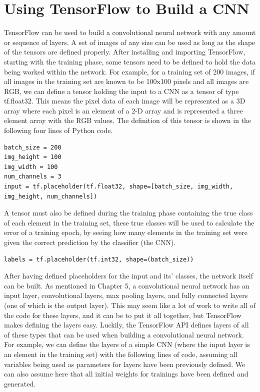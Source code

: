\documentclass[12pt]{report} %
\begin{document}
\section{Using TensorFlow to Build a CNN}
	TensorFlow can be used to build a convolutional neural network with any amount or sequence of layers. A set of images of any size can be used as long as the shape of the tensors are defined properly. After installing and importing TensorFlow, starting with the training phase, some tensors need to be defined to hold the data being worked within the network. For example, for a training set of 200 images, if all images in the training set are known to be 100x100 pixels and all images are RGB, we can define a tensor holding the input to a CNN as a tensor of type tf.float32. This means the pixel data of each image will be represented as a 3D array where each pixel is an element of a 2-D array and is represented a three element array with the RGB values. The definition of this tensor is shown in the following four lines of Python code.
\begin{verbatim}
batch_size = 200
img_height = 100
img_width = 100
num_channels = 3
input = tf.placeholder(tf.float32, shape=[batch_size, img_width, img_height, num_channels])
\end{verbatim}

	A tensor must also be defined during the training phase containing the true class of each element in the training set, these true classes will be used to calculate the error of a training epoch, by seeing how many elements in the training set were given the correct prediction by the classifier (the CNN).
\begin{verbatim}
labels = tf.placeholder(tf.int32, shape=(batch_size))
\end{verbatim}
	
	After having defined placeholders for the input and its' classes, the network itself can be built. As mentioned in Chapter 5, a convolutional neural network has an input layer, convolutional layers, max pooling layers, and fully connected layers (one of which is the output layer). This may seem like a lot of work to write all of the code for these layers, and it can be to put it all together, but TensorFlow makes defining the layers easy. Luckily, the TensorFlow API defines layers of all of these types that can be used when building a convolutional neural network. For example, we can define the layers of a simple CNN (where the input layer is an element in the training set) with the following lines of code, assuming all variables being used as parameters for layers have been previously defined. We can also assume here that all initial weights for trainings have been defined and generated.
	
\end{document}
